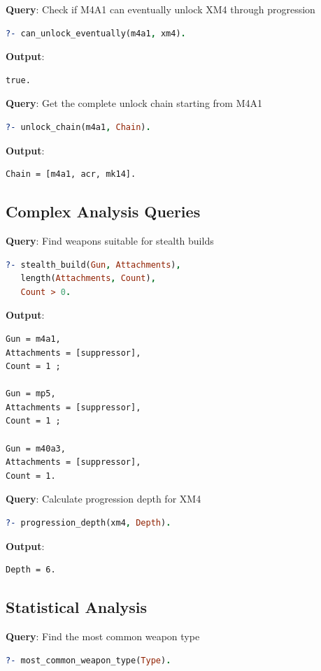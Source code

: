 \documentclass[12pt,a4paper]{article}
\begin{document}
\textbf{Query}: Check if M4A1 can eventually unlock XM4 through progression
\begin{lstlisting}[language=Prolog]
?- can_unlock_eventually(m4a1, xm4).
\end{lstlisting}

\textbf{Output}:
\begin{lstlisting}
true.
\end{lstlisting}

\textbf{Query}: Get the complete unlock chain starting from M4A1
\begin{lstlisting}[language=Prolog]
?- unlock_chain(m4a1, Chain).
\end{lstlisting}

\textbf{Output}:
\begin{lstlisting}
Chain = [m4a1, acr, mk14].
\end{lstlisting}

\subsection{Complex Analysis Queries}

\textbf{Query}: Find weapons suitable for stealth builds
\begin{lstlisting}[language=Prolog]
?- stealth_build(Gun, Attachments),
   length(Attachments, Count),
   Count > 0.
\end{lstlisting}

\textbf{Output}:
\begin{lstlisting}
Gun = m4a1,
Attachments = [suppressor],
Count = 1 ;

Gun = mp5,
Attachments = [suppressor],
Count = 1 ;

Gun = m40a3,
Attachments = [suppressor],
Count = 1.
\end{lstlisting}

\textbf{Query}: Calculate progression depth for XM4
\begin{lstlisting}[language=Prolog]
?- progression_depth(xm4, Depth).
\end{lstlisting}

\textbf{Output}:
\begin{lstlisting}
Depth = 6.
\end{lstlisting}

\subsection{Statistical Analysis}

\textbf{Query}: Find the most common weapon type
\begin{lstlisting}[language=Prolog]
?- most_common_weapon_type(Type).
\end{lstlisting}
\end{document}
